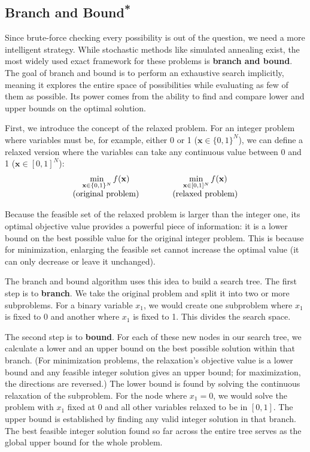 \subsection{\texorpdfstring{Branch and Bound\textsuperscript{*}}{Branch and Bound}}
\label{sec:branch-and-bound}

Since brute-force checking every possibility is out of the question, we need a more intelligent strategy. While stochastic methods like simulated annealing exist, the most widely used exact framework for these problems is \textbf{branch and bound}. The goal of branch and bound is to perform an exhaustive search implicitly, meaning it explores the entire space of possibilities while evaluating as few of them as possible. Its power comes from the ability to find and compare lower and upper bounds on the optimal solution.

First, we introduce the concept of the relaxed problem. For an integer problem where variables must be, for example, either 0 or 1 ($\mathbf{x} \in \{0, 1\}^N$), we can define a relaxed version where the variables can take any continuous value between 0 and 1 ($\mathbf{x} \in [0, 1]^N$):
\begin{equation}
    { \everymath={\displaystyle}
    \begin{array}{c@{\qquad\qquad}c}
        \min_{\mathbf{x} \in \{0, 1\}^N} f(\mathbf{x}) & \min_{\mathbf{x} \in [0, 1]^N} f(\mathbf{x}) \\[6pt]
        \text{(original problem)} & \text{(relaxed problem)}
    \end{array}
    }
\end{equation}

Because the feasible set of the relaxed problem is larger than the integer one, its optimal objective value provides a powerful piece of information: it is a lower bound on the best possible value for the original integer problem. This is because for minimization, enlarging the feasible set cannot increase the optimal value (it can only decrease or leave it unchanged).

The branch and bound algorithm uses this idea to build a search tree. The first step is to \textbf{branch}. We take the original problem and split it into two or more subproblems. For a binary variable $x_1$, we would create one subproblem where $x_1$ is fixed to 0 and another where $x_1$ is fixed to 1. This divides the search space.

The second step is to \textbf{bound}. For each of these new nodes in our search tree, we calculate a lower and an upper bound on the best possible solution within that branch. (For minimization problems, the relaxation's objective value is a lower bound and any feasible integer solution gives an upper bound; for maximization, the directions are reversed.) The lower bound is found by solving the continuous relaxation of the subproblem. For the node where $x_1=0$, we would solve the problem with $x_1$ fixed at 0 and all other variables relaxed to be in $[0,1]$. The upper bound is established by finding any valid integer solution in that branch. The best feasible integer solution found so far across the entire tree serves as the global upper bound for the whole problem.

